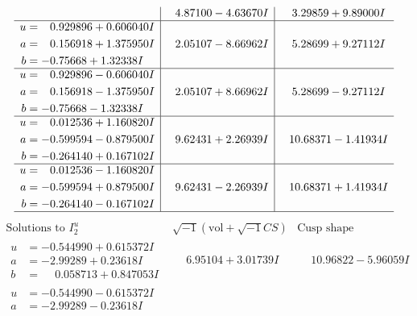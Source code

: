 \documentclass[1p]{elsarticle_modified}
\theoremstyle{definition}
\newcommand{\I}{\sqrt{-1}}
\begin{document}
$$\begin{array}{c|c|c}
 & \phantom{-}4.87100 - 4.63670 I & \phantom{-}3.29859 + 9.89000 I \\ \hline\begin{aligned}
u &= \phantom{-}0.929896 + 0.606040 I \\
a &= \phantom{-}0.156918 + 1.375950 I \\
b &= -0.75668 + 1.32338 I\end{aligned}
 & \phantom{-}2.05107 - 8.66962 I & \phantom{-}5.28699 + 9.27112 I \\ \hline\begin{aligned}
u &= \phantom{-}0.929896 - 0.606040 I \\
a &= \phantom{-}0.156918 - 1.375950 I \\
b &= -0.75668 - 1.32338 I\end{aligned}
 & \phantom{-}2.05107 + 8.66962 I & \phantom{-}5.28699 - 9.27112 I \\ \hline\begin{aligned}
u &= \phantom{-}0.012536 + 1.160820 I \\
a &= -0.599594 - 0.879500 I \\
b &= -0.264140 + 0.167102 I\end{aligned}
 & \phantom{-}9.62431 + 2.26939 I & \phantom{-}10.68371 - 1.41934 I \\ \hline\begin{aligned}
u &= \phantom{-}0.012536 - 1.160820 I \\
a &= -0.599594 + 0.879500 I \\
b &= -0.264140 - 0.167102 I\end{aligned}
 & \phantom{-}9.62431 - 2.26939 I & \phantom{-}10.68371 + 1.41934 I\\
 \hline 
 \end{array}$$\newpage$$\begin{array}{c|c|c}  
\text{Solutions to }I^u_{2}& \I (\text{vol} + \sqrt{-1}CS) & \text{Cusp shape}\\
 \hline 
\begin{aligned}
u &= -0.544990 + 0.615372 I \\
a &= -2.99289 + 0.23618 I \\
b &= \phantom{-}0.058713 + 0.847053 I\end{aligned}
 & \phantom{-}6.95104 + 3.01739 I & \phantom{-}10.96822 - 5.96059 I \\ \hline\begin{aligned}
u &= -0.544990 - 0.615372 I \\
a &= -2.99289 - 0.23618 I \\

\end{aligned}
\end{array}$$
\end{document}
